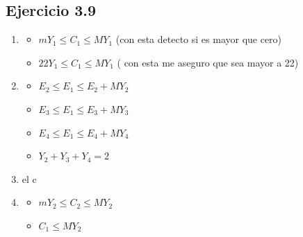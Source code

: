 \documentclass[12pt]{book}
\begin{document}
\subsection{Ejercicio 3.9}
\begin{enumerate}[a]


\item 
	\begin{itemize}
	\item 	$ m Y_1 \leq C_1 \leq  M Y_1$ (con esta detecto si es mayor que cero)
	\item	$ 22 Y_1 \leq C_1 \leq M Y_1$  ( con esta me aseguro que sea mayor a 22)
	\end{itemize}

\item 
	\begin{itemize}
	\item 	$ E_2 \leq E_1 \leq  E_2 + M Y_2 $ 
	\item 	$ E_3 \leq E_1 \leq  E_3 + M Y_3 $ 
	\item 	$ E_4 \leq E_1 \leq  E_4 + M Y_4 $ 
	\item 	$ Y_2 + Y_3 + Y_4 = 2 $ 		
	\end{itemize}

\item \quad el c
\item 
	\begin{itemize}
	\item 	$ m Y_2 \leq C_2 \leq M Y_2 $ 
	\item 	$ C_1\leq M Y_2 $ 
	\end{itemize}




\end{enumerate}
\end{document}
